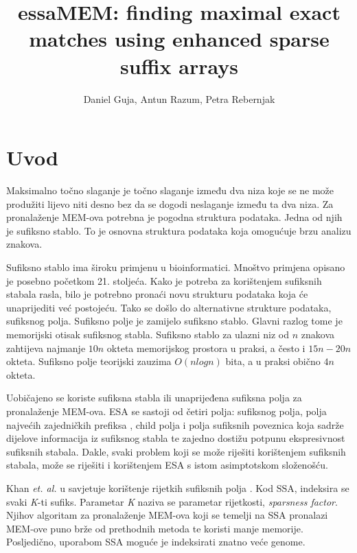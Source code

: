 \documentclass[times, utf8, seminar, numeric]{fer}
\begin{document}
\title{essaMEM: finding maximal exact matches using enhanced sparse suffix arrays}
\author{Daniel Guja, Antun Razum, Petra Rebernjak}

\maketitle
\tableofcontents

\chapter{Uvod}
Maksimalno točno slaganje  je točno slaganje između dva niza koje se ne može produžiti lijevo niti desno bez da se dogodi neslaganje između ta dva niza. Za pronalaženje MEM-ova potrebna je pogodna struktura podataka. Jedna od njih je sufiksno stablo. To je osnovna struktura podataka koja omogućuje brzu analizu znakova. 

Sufiksno stablo ima široku primjenu u bioinformatici. Mnoštvo primjena opisano je posebno početkom 21. stoljeća. Kako je potreba za korištenjem sufiksnih stabala rasla, bilo je potrebno pronaći novu strukturu podataka koja će unaprijediti već postojeću. Tako se došlo do alternativne strukture podataka, sufiksnog polja. Sufiksno polje je zamijelo sufiksno stablo. Glavni razlog tome je memorijski otisak sufiksnog stabla. Sufiksno stablo za ulazni niz od $n$ znakova zahtijeva najmanje $10n$ okteta memorijskog prostora u praksi, a često i $15n-20n$ okteta. Sufiksno polje teorijski zauzima $O(n log n)$ bita, a u praksi obično $4n$ okteta.

Uobičajeno se koriste sufiksna stabla ili unaprijeđena sufiksna polja  za pronalaženje MEM-ova. ESA se sastoji od četiri polja: sufiksnog polja, polja najvećih zajedničkih prefiksa , child polja i polja sufiksnih poveznica  koja sadrže dijelove informacija iz sufiksnog stabla te zajedno dostižu potpunu ekspresivnost sufiksnih stabala. Dakle, svaki problem koji se može riješiti korištenjem sufiksnih stabala, može se riješiti i korištenjem ESA s istom asimptotskom složenošću.

Khan \textit{et. al.} u \cite{ssa} savjetuje korištenje rijetkih sufiksnih polja . Kod SSA, indeksira se svaki \textit{K}-ti sufiks. Parametar \textit{K} naziva se parametar rijetkosti, \textit{sparsness factor}. Njihov algoritam za pronalaženje MEM-ova koji se temelji na SSA pronalazi MEM-ove puno brže od prethodnih metoda te koristi manje memorije. Posljedično, uporabom SSA moguće je indeksirati znatno veće genome.
\end{document}
